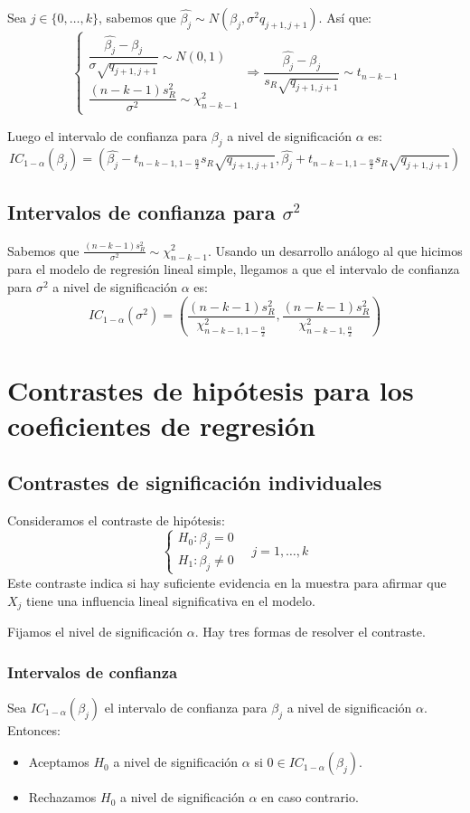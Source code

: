 Sea $j \in \{0, \dots, k\}$, sabemos que $\hat{\beta_j} \sim N(\beta_j, \sigma^2 q_{j+1, j+1})$.
Así que:
$$\begin{cases}
        \dfrac{\hat{\beta_j} - \beta_j}{\sigma \sqrt{q_{j+1, j+1}}} \sim N(0, 1) \\
        \dfrac{(n-k-1)s_R^2}{\sigma^2} \sim \chi^2_{n-k-1}
    \end{cases} \Rightarrow \frac{\hat{\beta_j} - \beta_j}{s_R \sqrt{q_{j+1, j+1}}} \sim t_{n-k-1}$$

Luego el intervalo de confianza para $\beta_j$ a nivel de significación $\alpha$ es:
$$IC_{1-\alpha}(\beta_j) = \left( \hat{\beta_j} - t_{n-k-1, 1-\frac{\alpha}{2}} s_R \sqrt{q_{j+1, j+1}}, \hat{\beta_j} + t_{n-k-1, 1-\frac{\alpha}{2}} s_R \sqrt{q_{j+1, j+1}} \right)$$

\subsection*{Intervalos de confianza para $\sigma^2$}
Sabemos que $\frac{(n-k-1)s_R^2}{\sigma^2} \sim \chi^2_{n-k-1}$.
Usando un desarrollo análogo al que hicimos para el modelo de regresión lineal simple, llegamos a que el intervalo de confianza para $\sigma^2$ a nivel de significación $\alpha$ es:
$$IC_{1-\alpha}(\sigma^2) = \left( \frac{(n-k-1)s_R^2}{\chi^2_{n-k-1, 1-\frac{\alpha}{2}}}, \frac{(n-k-1)s_R^2}{\chi^2_{n-k-1, \frac{\alpha}{2}}} \right)$$

\section{Contrastes de hipótesis para los coeficientes de regresión}
\subsection*{Contrastes de significación individuales}
Consideramos el contraste de hipótesis:
$$\begin{cases}
        H_0: \beta_j = 0 \\
        H_1: \beta_j \neq 0
    \end{cases} \quad j = 1, \dots, k$$
Este contraste indica si hay suficiente evidencia en la muestra para afirmar que $X_j$ tiene una influencia lineal significativa en el modelo.

Fijamos el nivel de significación $\alpha$.
Hay tres formas de resolver  el contraste.

\subsubsection*{Intervalos de confianza}
Sea $IC_{1-\alpha}(\beta_j)$ el intervalo de confianza para $\beta_j$ a nivel de significación $\alpha$.
Entonces:
\begin{itemize}
    \item Aceptamos $H_0$ a nivel de significación $\alpha$ si $0 \in IC_{1-\alpha}(\beta_j)$.
    \item Rechazamos $H_0$ a nivel de significación $\alpha$ en caso contrario.
\end{itemize}

